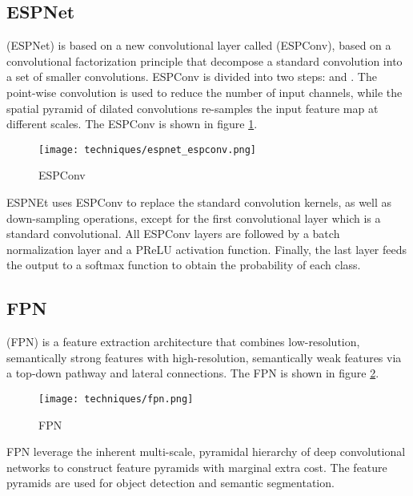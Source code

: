   \subsection{ESPNet\cite{mehta2018espnet}}

     (ESPNet) is based on a new convolutional
    layer called  (ESPConv), based on a
    convolutional factorization principle that decompose a standard convolution
    into a set of smaller convolutions\cite{mehta2018espnet}. ESPConv is divided
    into two steps:  and . The point-wise convolution is used to reduce the number of
    input channels, while the spatial pyramid of dilated convolutions re-samples
    the input feature map at different scales. The ESPConv is shown in figure
    \ref{fig:espnet_espconv}.
    \begin{figure}[htbp]
      \centering
      \texttt{[image: techniques/espnet\_espconv.png]}
      \caption{ESPConv\cite{mehta2018espnet}}
      \label{fig:espnet_espconv}
    \end{figure}
    ESPNEt uses ESPConv to replace the standard convolution kernels, as well as 
    down-sampling operations, except for the first convolutional layer which is
    a standard convolutional\cite{mehta2018espnet}. All ESPConv layers are
    followed by a batch normalization layer and a PReLU activation function.
    Finally, the last layer feeds the output to a softmax function to obtain
    the probability of each class\cite{mehta2018espnet}.

  \subsection{FPN\cite{lin2017feature}}

     (FPN) is a feature extraction architecture
    that combines low-resolution, semantically strong features with high-resolution,
    semantically weak features via a top-down pathway and lateral connections\cite{lin2017feature}.
    The FPN is shown in figure \ref{fig:fpn}.
    \begin{figure}[htbp]
      \centering
      \texttt{[image: techniques/fpn.png]}
      \caption{FPN\cite{lin2017feature}}
      \label{fig:fpn}
    \end{figure}
    FPN leverage the inherent multi-scale, pyramidal hierarchy of deep convolutional
    networks to construct feature pyramids with marginal extra cost. The feature
    pyramids are used for object detection and semantic segmentation\cite{lin2017feature}.

